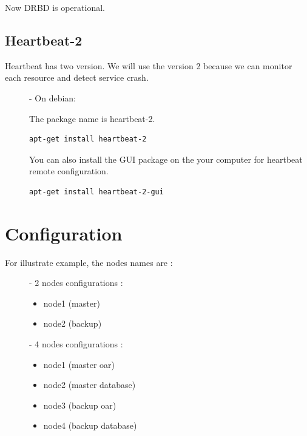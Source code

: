 \documentclass[a4paper,10pt]{report}
\begin{document}
Now DRBD is operational.


\section{Heartbeat-2}
Heartbeat has two version. We will use the version 2 because we can monitor each resource and detect service crash.
\begin{description}
\item[]- On debian:

The package name is heartbeat-2.
\begin{lstlisting}
apt-get install heartbeat-2
\end{lstlisting}
You can also install the GUI package on the your computer for heartbeat remote configuration.
\begin{lstlisting}
apt-get install heartbeat-2-gui
\end{lstlisting}
\end{description}











\chapter{Configuration}

For illustrate example, the nodes names are :
\begin{description}
\item[]- 2 nodes configurations : 
\begin{itemize}
\item node1 (master)
\item node2 (backup)
\end{itemize}

\item[]- 4 nodes configurations :
\begin{itemize}
\item node1 (master oar)
\item node2 (master database)
\item node3 (backup oar)
\item node4 (backup database)
\end{itemize}
\end{description}
\end{document}

